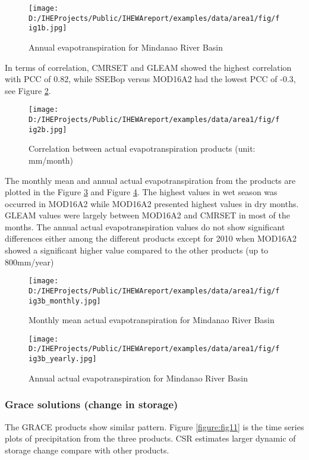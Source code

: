 \documentclass[oneside,openany]{article}%
\begin{document}
\begin{figure}[H]%
\centering%
\texttt{[image: D:/IHEProjects/Public/IHEWAreport/examples/data/area1/fig/fig1b.jpg]}%
\caption{Annual evapotranspiration  for Mindanao River Basin}%
\label{figure:fig7}%
\end{figure}

%
In terms of correlation, CMRSET and GLEAM showed the highest correlation with PCC of 0.82, while  SSEBop versus  MOD16A2 had the lowest PCC of  -0.3, see Figure \ref{figure:fig8}.%
\linebreak%


\begin{figure}[H]%
\centering%
\texttt{[image: D:/IHEProjects/Public/IHEWAreport/examples/data/area1/fig/fig2b.jpg]}%
\caption{Correlation between actual evapotranspiration products (unit: mm/month)}%
\label{figure:fig8}%
\end{figure}

%
The monthly mean and annual actual evapotranspiration from the products are plotted in the Figure \ref{figure:fig9} and Figure \ref{figure:fig10}. The highest values in wet season was occurred in MOD16A2 while MOD16A2 presented highest values in dry months. GLEAM values were largely between MOD16A2 and CMRSET in most of the months.%
\linebreak%
The annual actual evapotranspiration values do not show significant differences either among the different products except for 2010 when MOD16A2 showed a significant higher value compared to the other products (up to 800mm/year)%
\linebreak%


\begin{figure}[H]%
\centering%
\texttt{[image: D:/IHEProjects/Public/IHEWAreport/examples/data/area1/fig/fig3b\_monthly.jpg]}%
\caption{Monthly mean actual evapotranspiration for Mindanao River Basin}%
\label{figure:fig9}%
\end{figure}

%


\begin{figure}[H]%
\centering%
\texttt{[image: D:/IHEProjects/Public/IHEWAreport/examples/data/area1/fig/fig3b\_yearly.jpg]}%
\caption{Annual actual evapotranspiration for Mindanao River Basin}%
\label{figure:fig10}%
\end{figure}

%
\subsubsection{Grace solutions (change in storage)}%
\label{ssubsec:Gracesolutions(changeinstorage)}%
The GRACE products show similar pattern. Figure \ref{figure:fig11} is the time series plots of precipitation from the three products. CSR estimates larger dynamic of storage change compare with other products.%
\linebreak%
\end{document}

